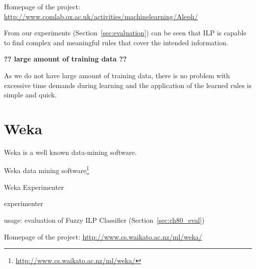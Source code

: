 \medskip
Homepage of the project: \url{http://www.comlab.ox.ac.uk/activities/machinelearning/Aleph/}



From our experiments (Section~\ref{sec:evaluation}) can be seen that ILP is capable to find complex and meaningful rules that cover the intended information.



\textbf{?? large amount of training data ??}

As we do not have large amount of training data, there is no problem with excessive time demands during learning and the application of the learned rules is simple and quick.



\section{Weka} \label{sec:ch30_weka}

Weka \citep{biblio:Weka} is a well known data-mining software.

Weka data mining software\footnote{\url{http://www.cs.waikato.ac.nz/ml/weka/}} \citep{biblio:Weka}

Weka Experimenter 

experimenter

usage: evaluation of Fuzzy ILP Classifier (Section~\ref{sec:ch80_eval})

\medskip
Homepage of the project: \url{http://www.cs.waikato.ac.nz/ml/weka/}

